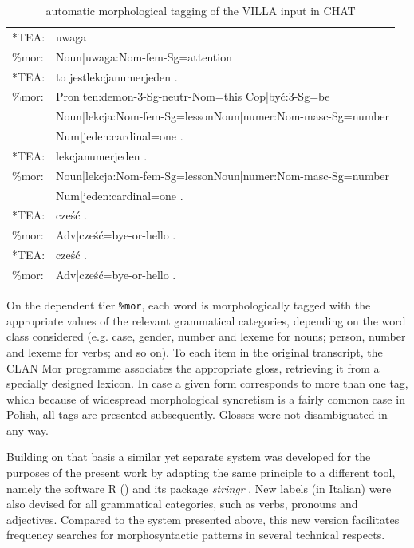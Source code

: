\begin{table}
\ttfamily
    \begin{tabular}{ll}
        *TEA:   & uwaga\\
        \%mor:  & Noun|uwaga:Nom-fem-Sg=attention\\
        *TEA:   & to jestlekcjanumerjeden . \\
        \%mor:  & Pron|ten:demon-3-Sg-neutr-Nom=this Cop|być:3-Sg=be \\
        ~       & Noun|lekcja:Nom-fem-Sg=lessonNoun|numer:Nom-masc-Sg=number\\
        ~       & Num|jeden:cardinal=one . \\
        *TEA:   & lekcjanumerjeden .  \\
        \%mor:  & Noun|lekcja:Nom-fem-Sg=lessonNoun|numer:Nom-masc-Sg=number\\
        ~       & Num|jeden:cardinal=one . \\
        *TEA:   & cześć .  \\
        \%mor:  & Adv|cześć=bye-or-hello . \\
        *TEA:   & cześć .  \\
        \%mor:  & Adv|cześć=bye-or-hello . \\
    \end{tabular}
    \caption{automatic morphological tagging of the VILLA input in CHAT}
    \label{tab:02:2}
\end{table}

On the dependent tier \texttt{\%mor}, each word is morphologically tagged with the appropriate values of the relevant grammatical categories, depending on the word class considered (e.g. case, gender, number and lexeme for nouns; person, number and lexeme for verbs; and so on). To each item in the original transcript, the CLAN Mor programme associates the appropriate gloss, retrieving it from a specially designed lexicon. In case a given form corresponds to more than one tag, which because of widespread morphological syncretism is a fairly common case in Polish, all tags are presented subsequently. Glosses were not disambiguated in any way.

Building on that basis  a similar yet separate system was developed for the purposes of the present work by adapting the same principle to a different tool, namely the software R (\citealt{RCoreTeam2017}) and its package \textit{stringr} \citep{Wickham2017}. New labels (in Italian) were also devised for all grammatical categories, such as verbs, pronouns and adjectives. Compared to the system presented above, this new version facilitates frequency searches for morphosyntactic patterns in several technical respects.

